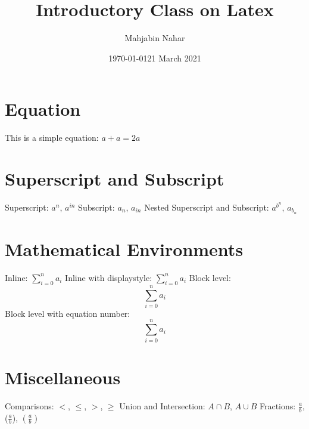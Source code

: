 \documentclass[16pt, a4paper]{article} %
\title{Introductory Class on Latex}
\author{Mahjabin Nahar}
\date{\today}
\date{21 March 2021}
\begin{document}
\maketitle
\tableofcontents %
\pagebreak %

\section{Equation}
This is a simple equation: $a + a = 2a$

\section{Superscript and Subscript}
Superscript: $a^n$, $a^{in}$
\newline
Subscript: $a_n$, $a_{in}$
\newline
Nested Superscript and Subscript: $a^{b^n}$, $a_{b_n}$

\section{Mathematical Environments}
Inline: $\sum_{i=0}^n a_i$
\newline
Inline with displaystyle: $\displaystyle\sum_{i=0}^n a_i$
\newline
Block level: $$\sum_{i=0}^n a_i$$
\newline
Block level with equation number:
\begin{equation}
\sum_{i=0}^n a_i
\end{equation}

\section{Miscellaneous}
Comparisons:
$ <$, $ \leq $, $ > $, $\geq $
\newline
Union and Intersection:
$A \cap B$, $A \cup B$
\newline
Fractions: $\frac{a}{b}$, ($\frac{a}{b}$), $\left(\frac{a}{b}\right)$
\end{document}
